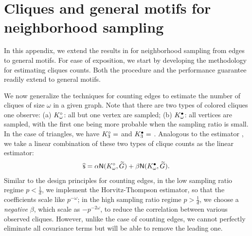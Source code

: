 \section{Cliques and general motifs for neighborhood sampling} \label{app:general_motif}

In this appendix, we extend the results in  for neighborhood sampling from edges to general motifs. For ease of exposition, we start by developing the methodology for estimating cliques counts. Both the procedure and the performance guarantee readily extend to general motifs.

We now generalize the techniques for counting edges to estimate the number of cliques of size $\omega$ in a given graph.
Note that there are two types of colored cliques one observe:
(a) $K^{\circ}_\omega$: 
all but one vertex are sampled; (b) $K^{\bullet}_\omega$: all vertices are sampled, with the first one being more probable when the sampling ratio is small.
In the case of triangles, we have 
$K^{\circ}_3=$
and 
$K^{\bullet}_3=$
.
Analogous to the estimator , 
we take a linear combination of these two types of clique counts as the linear estimator:
\begin{equation}
\widehat{\mathsf{s}} = \alpha {\mathsf{N}}(K^{\circ}_\omega,{\widetilde{G}}) + \beta {\mathsf{N}}(K^{\bullet}_\omega,{\widetilde{G}}).
\label{eq:cliqueest}
\end{equation}
Similar to the design principles for counting edges, in the low sampling ratio regime $p < \frac{1}{d}$, we implement the Horvitz-Thompson estimator, so that the coefficients scale like $p^{-\omega}$; in the high sampling ratio regime $p > \frac{1}{d}$, we choose a \emph{negative} $\beta$, which scale as $-p^{-2\omega}$, to reduce the correlation between various observed cliques. However, unlike the case of counting edges, we cannot perfectly eliminate all covariance terms but will be able to remove the leading one.

